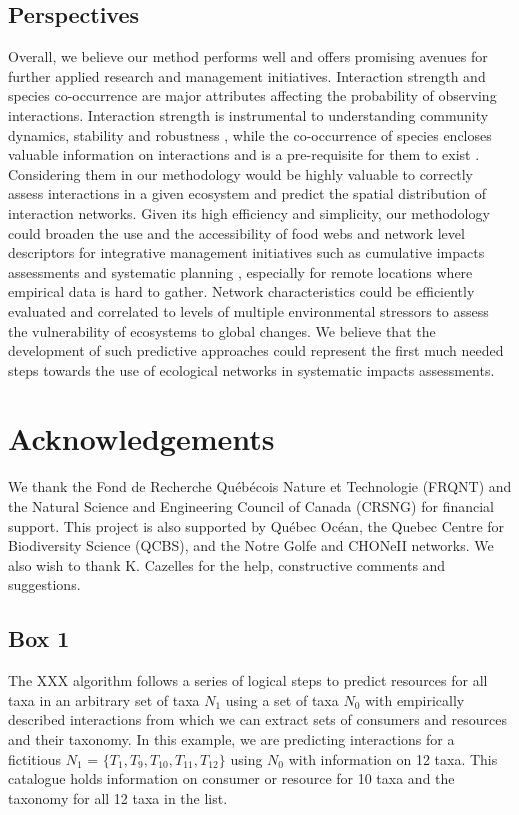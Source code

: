 \documentclass[letterpaper]{article}
\begin{document}
\subsection{Perspectives}
Overall, we believe our method performs well and offers promising avenues for further applied research and management initiatives. Interaction strength and species co-occurrence are major attributes affecting the probability of observing interactions. Interaction strength is instrumental to understanding community dynamics, stability and robustness \citep{Laska1998, Morales-Castilla2015}, while the co-occurrence of species encloses valuable information on interactions and is a pre-requisite for them to exist \citep{Cazelles2016}. Considering them in our methodology would be highly valuable to correctly assess interactions in a given ecosystem and predict the spatial distribution of interaction networks.
Given its high efficiency and simplicity, our methodology could broaden the use and the accessibility of food webs and network level descriptors for integrative management initiatives such as cumulative impacts assessments and systematic planning \citep{Giakoumi2015, Beauchesne2016}, especially for remote locations where empirical data is hard to gather. Network characteristics could be efficiently evaluated and correlated to levels of multiple environmental stressors to assess the vulnerability of ecosystems to global changes. We believe that the development of such predictive approaches could represent the first much needed steps towards the use of ecological networks in systematic impacts assessments.

\section{Acknowledgements}
We thank the Fond de Recherche Québécois Nature et Technologie (FRQNT) and the Natural Science and Engineering Council of Canada (CRSNG) for financial support. This project is also supported by Québec Océan, the Quebec Centre for Biodiversity Science (QCBS), and the Notre Golfe and CHONeII networks. We also wish to thank K. Cazelles for the help, constructive comments and suggestions.

\printbibliography


\newpage
\subsection{Box 1}
The XXX algorithm follows a series of logical steps to predict resources for all taxa in an arbitrary set of taxa $N_1$ using a set of taxa $N_0$ with empirically described interactions from which we can extract sets of consumers and resources and their taxonomy. In this example, we are predicting interactions for a fictitious $N_1$
 = $\{T_1, T_9, T_{10},T_{11}, T_{12}\}$ using $N_0$ with information on 12 taxa. This catalogue holds information on consumer or resource for 10 taxa and the taxonomy for all 12 taxa in the list.
\end{document}
